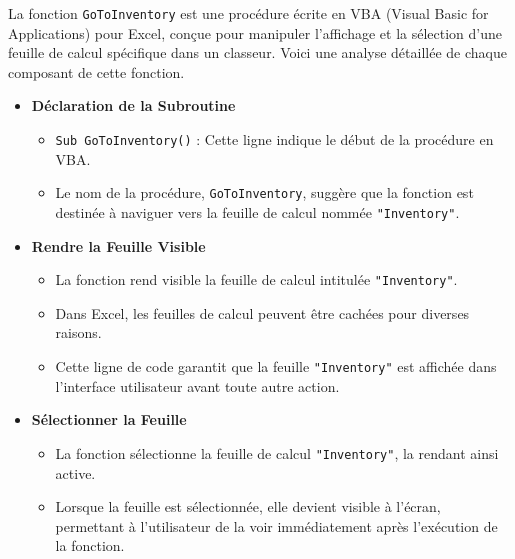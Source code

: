 \documentclass[a4paper, oneside, 12pt, final]{extreport}
\begin{document}
La fonction \texttt{GoToInventory} est une procédure écrite en VBA (Visual Basic for Applications) pour Excel, conçue pour manipuler l'affichage et la sélection d'une feuille de calcul spécifique dans un classeur. Voici une analyse détaillée de chaque composant de cette fonction.
\begin{itemize}

\item\textbf{Déclaration de la Subroutine}
\begin{itemize}
    \item \texttt{Sub GoToInventory()} : Cette ligne indique le début de la procédure en VBA.
    \item Le nom de la procédure, \texttt{GoToInventory}, suggère que la fonction est destinée à naviguer vers la feuille de calcul nommée \texttt{"Inventory"}.
\end{itemize}

\item\textbf{Rendre la Feuille Visible}
\begin{itemize}
    \item La fonction rend visible la feuille de calcul intitulée \texttt{"Inventory"}.
    \item Dans Excel, les feuilles de calcul peuvent être cachées pour diverses raisons.
    \item Cette ligne de code garantit que la feuille \texttt{"Inventory"} est affichée dans l'interface utilisateur avant toute autre action.
\end{itemize}

\item\textbf{Sélectionner la Feuille}
\begin{itemize}
    \item La fonction sélectionne la feuille de calcul \texttt{"Inventory"}, la rendant ainsi active.
    \item Lorsque la feuille est sélectionnée, elle devient visible à l'écran, permettant à l'utilisateur de la voir immédiatement après l'exécution de la fonction.
\end{itemize}
\end{itemize}
\end{document}
